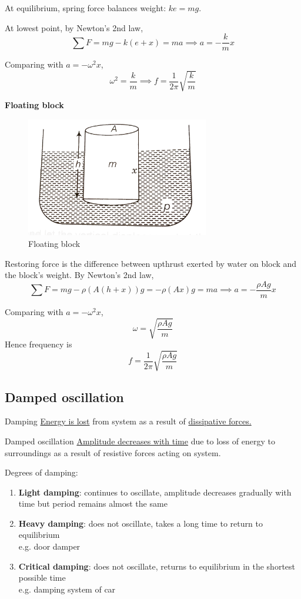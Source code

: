 At equilibrium, spring force balances weight: $ke=mg$.

At lowest point, by Newton's 2nd law,
\[ \sum F=mg-k(e+x)=ma \implies a=-\frac{k}{m}x \]

Comparing with $a=-\omega^2x$,
\[ \omega^2=\frac{k}{m} \implies f=\frac{1}{2\pi}\sqrt{\frac{k}{m}} \]
\pagebreak

\textbf{Floating block}

\begin{figure}[H]
    \centering
    \includegraphics[width=8cm]{images/floating_block_shm.png}
    \caption{Floating block}
\end{figure}

Restoring force is the difference between upthrust exerted by water on block and the block's weight. By Newton's 2nd law,
\[ \sum F=mg-\rho(A(h+x))g = -\rho(Ax)g = ma \implies a=-\frac{\rho Ag}{m}x \]

Comparing with $a=-\omega^2x$,
\[ \omega=\sqrt{\frac{\rho Ag}{m}} \]
Hence frequency is 
\[ f=\frac{1}{2\pi}\sqrt{\frac{\rho Ag}{m}} \]
\pagebreak


\subsection{Damped oscillation}
\begin{defn}{Damping}{}
\underline{Energy is lost} from system as a result of \underline{dissipative forces.}
\end{defn}

\begin{defn}{Damped oscillation}{}
\underline{Amplitude decreases with time} due to loss of energy to surroundings as a result of resistive forces acting on system.
\end{defn}

Degrees of damping:
\begin{enumerate}
\item \textbf{Light damping}: continues to oscillate, amplitude decreases gradually with time but period remains almost the same
\item \textbf{Heavy damping}: does not oscillate, takes a long time to return to equilibrium\\ e.g. door damper
\item \textbf{Critical damping}: does not oscillate, returns to equilibrium in the shortest possible time\\ e.g. damping system of car
\end{enumerate}

